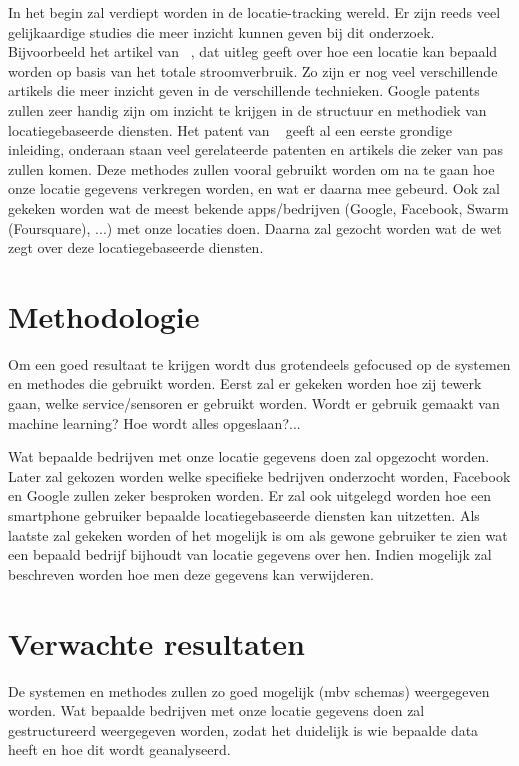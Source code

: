 In het begin zal verdiept worden in de locatie-tracking wereld. Er zijn reeds veel gelijkaardige studies die meer inzicht kunnen geven bij dit onderzoek. Bijvoorbeeld het artikel van ~\textcite{Yan2015}, dat uitleg geeft over hoe een locatie kan bepaald worden op basis van het totale stroomverbruik. Zo zijn er nog veel verschillende artikels die meer inzicht geven in de verschillende technieken. Google patents zullen zeer handig zijn om inzicht te krijgen in de structuur en methodiek van locatiegebaseerde diensten. Het patent van ~\textcite{Alan2005} geeft al een eerste grondige inleiding, onderaan staan veel gerelateerde patenten en artikels die zeker van pas zullen komen. Deze methodes zullen vooral gebruikt worden om na te gaan hoe onze locatie gegevens verkregen worden, en wat er daarna mee gebeurd. Ook zal gekeken worden wat de meest bekende apps/bedrijven (Google, Facebook, Swarm (Foursquare), ...) met onze locaties doen.
Daarna zal gezocht worden wat de wet zegt over deze locatiegebaseerde diensten.

\section{Methodologie}
\label{sec:methodologie}

Om een goed resultaat te krijgen wordt dus grotendeels gefocused op de systemen en methodes die gebruikt worden. Eerst zal er gekeken worden hoe zij tewerk gaan, welke service/sensoren er gebruikt worden. Wordt er gebruik gemaakt van machine learning? Hoe wordt alles opgeslaan?...

Wat bepaalde bedrijven met onze locatie gegevens doen zal opgezocht worden. Later zal gekozen worden welke specifieke bedrijven onderzocht worden, Facebook en Google zullen zeker besproken worden.
Er zal ook uitgelegd worden hoe een smartphone gebruiker bepaalde locatiegebaseerde diensten kan uitzetten.
Als laatste zal gekeken worden of het mogelijk is om als gewone gebruiker te zien wat een bepaald bedrijf bijhoudt van locatie gegevens over hen. Indien mogelijk zal beschreven worden hoe men deze gegevens kan verwijderen.



\section{Verwachte resultaten}
\label{sec:verwachte_resultaten}
De systemen en methodes zullen zo goed mogelijk (mbv schemas) weergegeven worden.
Wat bepaalde bedrijven met onze locatie gegevens doen zal gestructureerd weergegeven worden, zodat het duidelijk is wie bepaalde data heeft en hoe dit wordt geanalyseerd.


